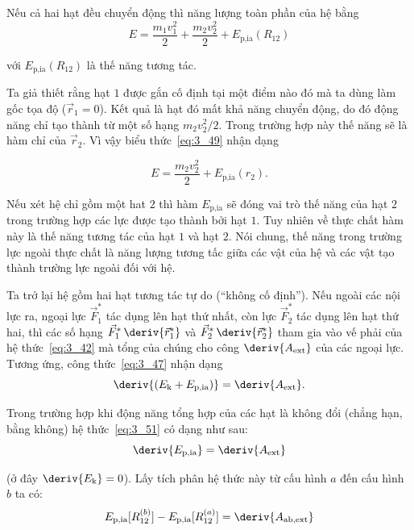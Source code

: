 Nếu cả hai hạt đều chuyển động thì năng lượng toàn phần của hệ bằng 
\begin{equation}\label{eq:3_49}
E = \frac{m_1v_1^2}{2} + \frac{m_2v_2^2}{2} + E_{\text{p,ia}}(R_{12}) 
\end{equation}

\noindent
với $E_{\text{p,ia}}(R_{12})$ là thế năng tương tác.

Ta giả thiết rằng hạt $1$ được gắn cố định tại một điểm nào đó mà ta dùng làm gốc tọa độ ($\vec{r}_1=0$). Kết quả là hạt đó mất khả năng chuyển động, do đó động năng chỉ tạo thành từ một số hạng $m_2v_2^2/2$. Trong trường hợp này thế năng sẽ là hàm chỉ của $\vec{r}_2$. Vì vậy biểu thức~\eqref{eq:3_49} nhận dạng

\begin{equation}\label{eq:3_50}
E = \frac{m_2v_2^2}{2} + E_{\text{p,ia}}(r_2).
\end{equation}

\noindent
Nếu xét hệ chỉ gồm một hat $2$ thì hàm $E_{\text{p,ia}}$ sẽ đóng vai trò thế năng của hạt $2$ trong trường hợp các lực được tạo thành bởi hạt $1$. Tuy nhiên về thực chất hàm này là thế năng tương tác của hạt $1$ và hạt $2$. Nói chung, thế năng trong trường lực ngoài thực chất là năng lượng tương tấc giữa các vật của hệ và các vật tạo thành trường lực ngoài đối với hệ. 

Ta trở lại hệ gồm hai hạt tương tác tự do (``không cố định''). Nếu ngoài các nội lực ra, ngoại lực $\vec{F}_1^*$  tác dụng lên hạt thứ nhất, còn lực $\vec{F}_2^*$ tác dụng lên hạt thứ hai, thì các số hạng $\vec{F}_1^*\,\deriv{\vec{r}_1^*}$ và $\vec{F}_2^*\,\deriv{\vec{r}_2^*}$ tham gia vào vế phải của hệ thức~\eqref{eq:3_42} mà tổng của chúng cho công $\deriv{A_{\text{ext}}}$ của các ngoại lực. Tương ứng, công thức~\eqref{eq:3_47} nhận dạng  
\begin{equation}\label{eq:3_51}
\deriv{(E_{\text{k}}+E_{\text{p,ia}})} = \deriv{A_{\text{ext}}}.
\end{equation}
    
Trong trường hợp khi động năng tổng hợp của các hạt là không đổi (chẳng hạn, bằng không) hệ thức~\eqref{eq:3_51} có dạng như sau:
\begin{equation}\label{eq:3_52}
\deriv{E_{\text{p,ia}}} = \deriv{A_{\text{ext}}}
\end{equation}

\noindent
(ở đây $\deriv{E_{\text{k}}}=0$). Lấy tích phân hệ thức này từ cấu hình $a$ đến cấu hình $b$ ta có:
\begin{equation}\label{eq:3_53}
E_{\text{p,ia}}[R_{12}^{(b)}] - E_{\text{p,ia}}[R_{12}^{(a)}] = \deriv{A_{\text{ab,ext}}}
\end{equation}

